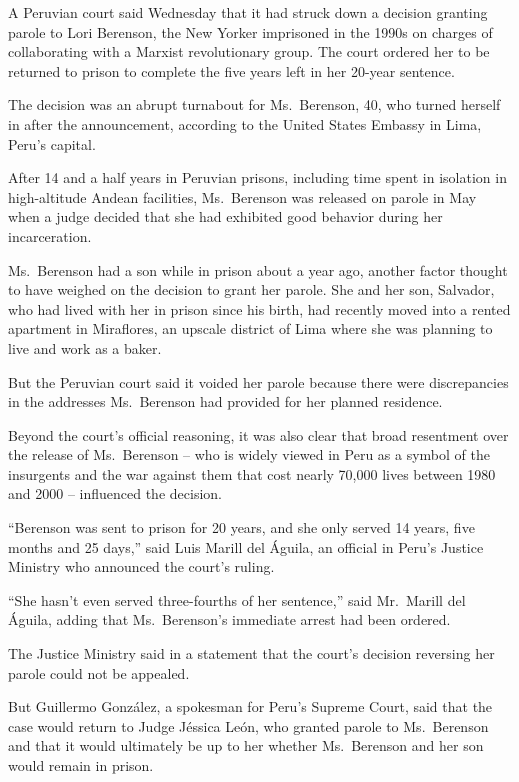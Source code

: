 ﻿\documentclass[12pt]{article}
\begin{document}
\lettrine{A}{} Peruvian court said Wednesday that it had struck down a
decision granting parole to Lori Berenson, the New Yorker imprisoned in the 1990s on charges of
collaborating with a Marxist revolutionary group. The court ordered her to be returned to prison to
complete the five years left in her 20-year sentence.

The decision was an abrupt turnabout for Ms.~Berenson, 40, who turned herself in after the
announcement, according to the United States Embassy in Lima, Peru's capital.

After 14 and a half years in Peruvian prisons, including time spent in isolation in high-altitude
Andean facilities, Ms.~Berenson was released on parole in May when a judge decided that she had
exhibited good behavior during her incarceration.

Ms.~Berenson had a son while in prison about a year ago, another factor thought to have weighed on
the decision to grant her parole. She and her son, Salvador, who had lived with her in prison since
his birth, had recently moved into a rented apartment in Miraflores, an upscale district of Lima
where she was planning to live and work as a baker.

But the Peruvian court said it voided her parole because there were discrepancies in the addresses
Ms.~Berenson had provided for her planned residence.

Beyond the court's official reasoning, it was also clear that broad resentment over the release of
Ms.~Berenson -- who is widely viewed in Peru as a symbol of the insurgents and the war against them
that cost nearly 70,000 lives between 1980 and 2000 -- influenced the decision.

``Berenson was sent to prison for 20 years, and she only served 14 years, five months and 25 days,''
said Luis Marill del \'Aguila, an official in Peru's Justice Ministry who announced the court's
ruling.

``She hasn't even served three-fourths of her sentence,'' said Mr.~Marill del \'Aguila, adding that
Ms.~Berenson's immediate arrest had been ordered.

The Justice Ministry said in a statement that the court's decision reversing her parole could not be
appealed.

But Guillermo Gonz\'alez, a spokesman for Peru's Supreme Court, said that the case would return to
Judge J\'essica Le\'on, who granted parole to Ms.~Berenson and that it would ultimately be up to her
whether Ms.~Berenson and her son would remain in prison.
\end{document}
